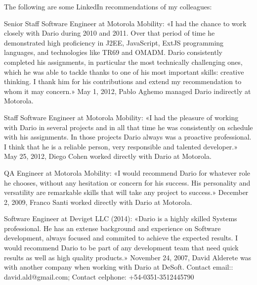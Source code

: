 \documentclass[paper=a4,fontsize=11pt]{scrartcl} %
\newcommand{\sepspace}{\vspace*{1em}}		%
\begin{document}
The following are some LinkedIn recommendations of my colleagues:

\sepspace

Senior Staff Software Engineer at Motorola Mobility:
«I had the chance to work closely with Dario during 2010 and 2011. Over that period of time he demonstrated high proficiency in J2EE, JavaScript, ExtJS programming languages, and technologies like TR69 and OMADM. Dario consistently completed his assignments, in particular the most technically challenging ones, which he was able to tackle thanks to one of his most important skills: creative thinking. I thank him for his contributions and extend my recommendation to whom it may concern.» 
May 1, 2012, Pablo Aghemo managed Dario indirectly at Motorola.

\sepspace

Staff Software Engineer at Motorola Mobility:
«I had the pleasure of working with Dario in several projects and in all that time he was consistently on schedule with his assignments. In those projects Dario always was a proactive professional. I think that he is a reliable person, very responsible and talented developer.»  
May 25, 2012, Diego Cohen worked directly with Dario at Motorola.

\sepspace

QA Engineer at Motorola Mobility:
«I would recommend Dario for whatever role he chooses, without any hesitation or concern for his success. His personality and versatility are remarkable skills that will take any project to success.»  
December 2, 2009, Franco Santi  worked directly with Dario at Motorola.

\sepspace

Software Engineer at Deviget LLC (2014):
«Dario is a highly skilled Systems professional. He has an extense background and experience on Software development, always focused and commited to achieve the expected results. I would recommend Dario to be part of any development team that need quick results as well as high quality products.»  
November 24, 2007, David Alderete was with another company when working with Dario at DeSoft.
Contact email:: david.ald@gmail.com; Contact celphone: +54-0351-3512445790

\sepspace
\end{document}
